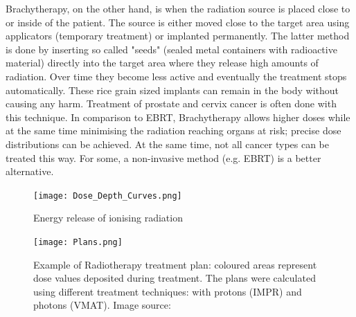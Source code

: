 Brachytherapy, on the other hand, is when the radiation source is placed close to or inside of the patient.
The source is either moved close to the target area using applicators (temporary treatment) or implanted permanently.
The latter method is done by inserting so called "seeds" (sealed metal containers with radioactive material) directly into the target area where they release high amounts of radiation.
Over time they become less active and eventually the treatment stops automatically.
These rice grain sized implants can remain in the body without causing any harm.
Treatment of prostate and cervix cancer is often done with this technique.
In comparison to EBRT, Brachytherapy allows higher doses while at the same time minimising the radiation reaching organs at risk; precise dose distributions can be achieved.
At the same time, not all cancer types can be treated this way.
For some, a non-invasive method (e.g. EBRT) is a better alternative.\\


\begin{figure}[!tbh]
	\centering
	\texttt{[image: Dose\_Depth\_Curves.png]}
	\caption[Energy release of ionising radiation]{Energy release of ionising radiation \footnotemark}
	\label{fig:bragg}
\end{figure}

\begin{figure}[!tbh]
	\centering
	\texttt{[image: Plans.png]}
	\caption[Example of Radiotherapy treatment plan (image source: \cite{Andrzejewski2015})]{Example of Radiotherapy treatment plan: coloured areas represent dose values deposited during treatment. The plans were calculated using different treatment techniques: with protons (IMPR) and photons (VMAT). Image source: \cite{Andrzejewski2015}}
	\label{fig:plan}
\end{figure}





